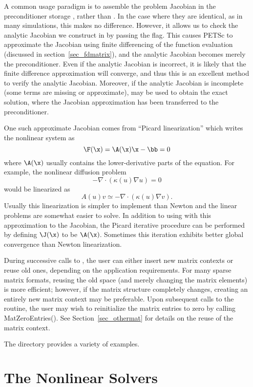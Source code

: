 A common usage paradigm is to assemble the problem Jacobian in the
preconditioner storage , rather than . In the case where they are
identical, as in many simulations, this makes no difference. However, it allows
us to check the analytic Jacobian we construct in  by
passing the  flag. This causes PETSc to approximate the
Jacobian using finite differencing of the function evaluation (discussed in
section~\ref{sec_fdmatrix}), and the analytic Jacobian becomes merely the
preconditioner. Even if the analytic Jacobian is incorrect, it is likely that
the finite difference approximation will converge, and thus this is an excellent
method to verify the analytic Jacobian. Moreover, if the analytic Jacobian is
incomplete (some terms are missing or approximate),  may
be used to obtain the exact solution, where the Jacobian approximation has been
transferred to the preconditioner.

One such approximate Jacobian comes from ``Picard linearization'' which writes the nonlinear system as
\[ \F(\x) = \A(\x) \x - \bb = 0 \]
where $\A(\x)$ usually contains the lower-derivative parts of the equation.
For example, the nonlinear diffusion problem
\[ - \nabla\cdot(\kappa(u) \nabla u) = 0 \]
would be linearized as
\[ A(u) v \simeq -\nabla\cdot(\kappa(u) \nabla v). \]
Usually this linearization is simpler to implement than Newton and the linear problems are somewhat easier to solve.
In addition to using  with this approximation to the Jacobian, the Picard iterative procedure can be performed by defining
$\J(\x)$ to be $\A(\x)$.
Sometimes this iteration exhibits better global convergence than Newton linearization.

During successive calls to , the user can either
insert new matrix contexts or reuse old ones, depending on the
application requirements. For many sparse matrix formats, reusing the
old space (and merely changing the matrix elements) is more efficient;
however, if the matrix structure completely changes, creating an
entirely new matrix context may be preferable.
Upon subsequent calls to the
 routine, the user may wish to reinitialize the matrix
entries to zero by calling MatZeroEntries().  See
Section~\ref{sec_othermat} for details on the reuse of the matrix
context.

The directory  provides
a variety of examples.


\section{The Nonlinear Solvers}
\label{sec_nlsolvers}


